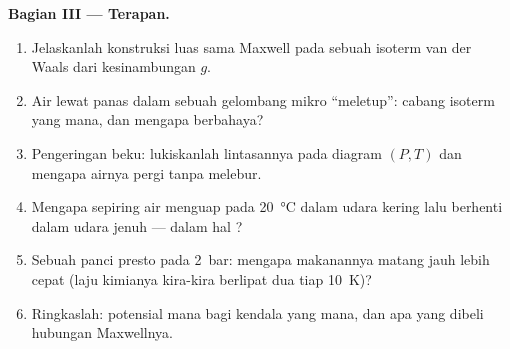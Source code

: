 \begin{problem}
\textbf{Bagian III --- Terapan.}
\begin{enumerate}[resume]
  \item Jelaskanlah konstruksi luas sama Maxwell pada sebuah isoterm van der
        Waals dari kesinambungan $g$.
  \item Air lewat panas dalam sebuah gelombang mikro ``meletup'': cabang isoterm
        yang mana, dan mengapa berbahaya?
  \item Pengeringan beku: lukiskanlah lintasannya pada diagram $(P,T)$ dan
        mengapa airnya pergi tanpa melebur.
  \item Mengapa sepiring air menguap pada \qty{20}{\celsius} dalam udara kering
        lalu berhenti dalam udara jenuh --- dalam hal ?
  \item Sebuah panci presto pada \qty{2}{bar}: mengapa makanannya matang jauh
        lebih cepat (laju kimianya kira-kira berlipat dua tiap
        \qty{10}{K})?
  \item Ringkaslah: potensial mana bagi kendala yang mana, dan apa yang
        dibeli hubungan Maxwellnya.
\end{enumerate}
\end{problem}
